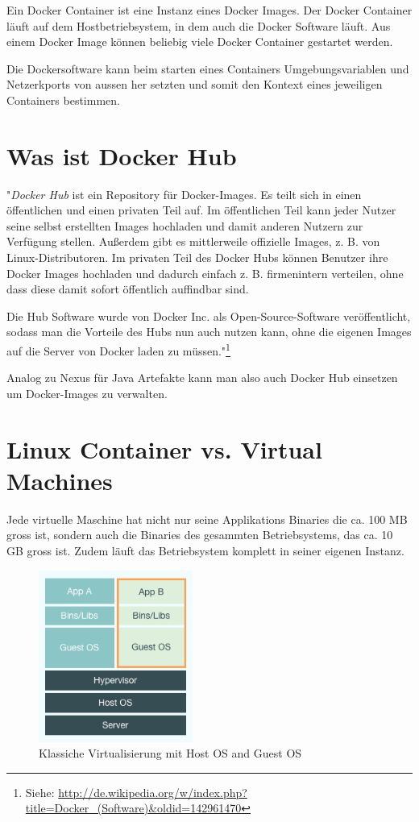 Ein Docker Container ist eine Instanz eines Docker Images. Der Docker Container läuft
auf dem Hostbetriebsystem, in dem auch die Docker Software läuft. Aus einem Docker Image
können beliebig viele Docker Container gestartet werden.

Die Dockersoftware kann beim starten eines Containers Umgebungsvariablen und Netzerkports
von aussen her setzten und somit den Kontext eines jeweiligen Containers bestimmen.

\section{Was ist Docker Hub}

"\textit{Docker Hub} ist ein Repository für Docker-Images. Es teilt sich in einen öffentlichen
und einen privaten Teil auf. Im öffentlichen Teil kann jeder Nutzer seine selbst erstellten
Images hochladen und damit anderen Nutzern zur Verfügung stellen. Außerdem gibt es mittlerweile
offizielle Images, z. B. von Linux-Distributoren. Im privaten Teil des Docker Hubs können
Benutzer ihre Docker Images hochladen und dadurch einfach z. B. firmenintern verteilen, ohne
dass diese damit sofort öffentlich auffindbar sind.

Die Hub Software wurde von Docker Inc. als Open-Source-Software veröffentlicht, sodass
man die Vorteile des Hubs nun auch nutzen kann, ohne die eigenen Images auf die Server
von Docker laden zu müssen."\footnote{Siehe: \url{http://de.wikipedia.org/w/index.php?title=Docker_(Software)&oldid=142961470}}

Analog zu Nexus für Java Artefakte kann man also auch Docker Hub einsetzen um Docker-Images
zu verwalten.

\section{Linux Container vs. Virtual Machines}

Jede virtuelle Maschine hat nicht nur seine Applikations Binaries die ca. 100 MB gross ist, sondern
auch die Binaries des gesammten Betriebsystems, das ca. 10 GB gross ist. Zudem läuft das Betriebsystem
komplett in seiner eigenen Instanz.

\begin{figure}[htbp]
  \begin{center}
    \includegraphics[width=0.45\textwidth]{./images/classic_virtual_machine.png}
    \caption{Klassiche Virtualisierung mit Host OS and Guest OS}
    \label{img:classic_virtual_machine}
  \end{center}
\end{figure}


